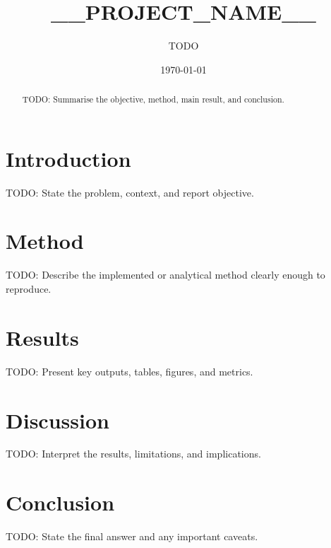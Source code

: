\documentclass[11pt]{article}
\title{__PROJECT_NAME__}
\author{TODO}
\date{\today}
\begin{document}
\maketitle

\begin{abstract}
TODO: Summarise the objective, method, main result, and conclusion.
\end{abstract}

\section{Introduction}

TODO: State the problem, context, and report objective.

\section{Method}

TODO: Describe the implemented or analytical method clearly enough to reproduce.

\section{Results}

TODO: Present key outputs, tables, figures, and metrics.

\section{Discussion}

TODO: Interpret the results, limitations, and implications.

\section{Conclusion}

TODO: State the final answer and any important caveats.



\end{document}
